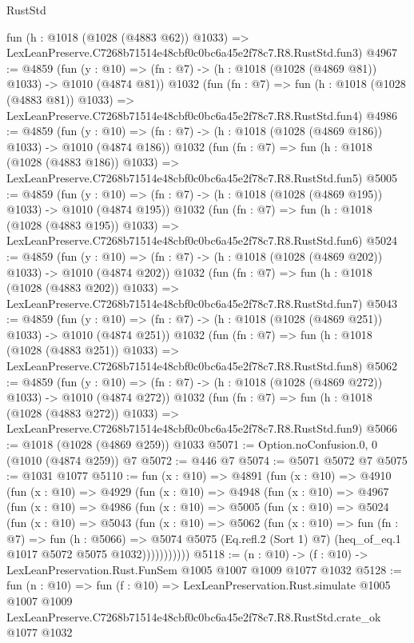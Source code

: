 \begin{lexlean}{RustStd}
\begin{coremodule}
    fun (h : @1018 (@1028 (@4883 @62)) @1033) =>
    LexLeanPreserve.C7268b71514e48cbf0c0bc6a45e2f78c7.R8.RustStd.fun3)
@4967 := @4859
    (fun (y : @10) => (fn : @7) -> (h : @1018 (@1028 (@4869 @81)) @1033) -> @1010 (@4874 @81))
    @1032
    (fun (fn : @7) =>
    fun (h : @1018 (@1028 (@4883 @81)) @1033) =>
    LexLeanPreserve.C7268b71514e48cbf0c0bc6a45e2f78c7.R8.RustStd.fun4)
@4986 := @4859
    (fun (y : @10) => (fn : @7) -> (h : @1018 (@1028 (@4869 @186)) @1033) -> @1010 (@4874 @186))
    @1032
    (fun (fn : @7) =>
    fun (h : @1018 (@1028 (@4883 @186)) @1033) =>
    LexLeanPreserve.C7268b71514e48cbf0c0bc6a45e2f78c7.R8.RustStd.fun5)
@5005 := @4859
    (fun (y : @10) => (fn : @7) -> (h : @1018 (@1028 (@4869 @195)) @1033) -> @1010 (@4874 @195))
    @1032
    (fun (fn : @7) =>
    fun (h : @1018 (@1028 (@4883 @195)) @1033) =>
    LexLeanPreserve.C7268b71514e48cbf0c0bc6a45e2f78c7.R8.RustStd.fun6)
@5024 := @4859
    (fun (y : @10) => (fn : @7) -> (h : @1018 (@1028 (@4869 @202)) @1033) -> @1010 (@4874 @202))
    @1032
    (fun (fn : @7) =>
    fun (h : @1018 (@1028 (@4883 @202)) @1033) =>
    LexLeanPreserve.C7268b71514e48cbf0c0bc6a45e2f78c7.R8.RustStd.fun7)
@5043 := @4859
    (fun (y : @10) => (fn : @7) -> (h : @1018 (@1028 (@4869 @251)) @1033) -> @1010 (@4874 @251))
    @1032
    (fun (fn : @7) =>
    fun (h : @1018 (@1028 (@4883 @251)) @1033) =>
    LexLeanPreserve.C7268b71514e48cbf0c0bc6a45e2f78c7.R8.RustStd.fun8)
@5062 := @4859
    (fun (y : @10) => (fn : @7) -> (h : @1018 (@1028 (@4869 @272)) @1033) -> @1010 (@4874 @272))
    @1032
    (fun (fn : @7) =>
    fun (h : @1018 (@1028 (@4883 @272)) @1033) =>
    LexLeanPreserve.C7268b71514e48cbf0c0bc6a45e2f78c7.R8.RustStd.fun9)
@5066 := @1018 (@1028 (@4869 @259)) @1033
@5071 := Option.noConfusion.{0, 0} (@1010 (@4874 @259)) @7
@5072 := @446 @7
@5074 := @5071 @5072 @7
@5075 := @1031 @1077
@5110 := fun (x : @10) =>
  @4891
    (fun (x : @10) =>
    @4910
      (fun (x : @10) =>
      @4929
        (fun (x : @10) =>
        @4948
          (fun (x : @10) =>
          @4967
            (fun (x : @10) =>
            @4986
              (fun (x : @10) =>
              @5005
                (fun (x : @10) =>
                @5024
                  (fun (x : @10) =>
                  @5043
                    (fun (x : @10) =>
                    @5062
                      (fun (x : @10) =>
                      fun (fn : @7) =>
                      fun (h : @5066) =>
                      @5074
                        @5075
                        (Eq.refl.{2} (Sort 1) @7)
                        (heq_of_eq.{1} @1017 @5072 @5075 @1032)))))))))))
@5118 := (n : @10) -> (f : @10) -> LexLeanPreservation.Rust.FunSem @1005 @1007 @1009 @1077 @1032
@5128 := fun (n : @10) =>
  fun (f : @10) =>
  LexLeanPreservation.Rust.simulate
    @1005
    @1007
    @1009
    LexLeanPreserve.C7268b71514e48cbf0c0bc6a45e2f78c7.R8.RustStd.crate_ok
    @1077
    @1032
\end{coremodule}
\end{lexlean}
